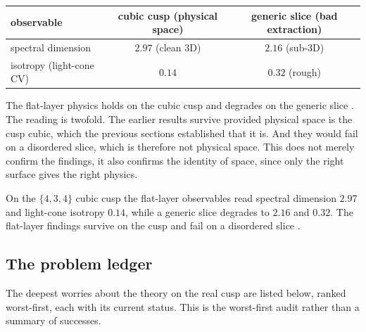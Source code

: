 \begin{table}[h]
\centering
\begin{tabular}{lcc}
\toprule
observable & cubic cusp (physical space) & generic slice (bad extraction) \\
\midrule
spectral dimension & $2.97$ (clean 3D) & $2.16$ (sub-3D) \\
isotropy (light-cone CV) & $0.14$ & $0.32$ (rough) \\
\bottomrule
\end{tabular}
\end{table}

The flat-layer physics holds on the cubic cusp and degrades on the generic slice
\cite{pollard2026vibetest}. The reading is twofold. The earlier results survive provided physical space is the
cusp cubic, which the previous sections established that it is. And they would fail on a disordered slice, which
is therefore not physical space. This does not merely confirm the findings, it also confirms the identity
of space, since only the right surface gives the right physics.

\begin{result}
On the $\{4,3,4\}$ cubic cusp the flat-layer observables read spectral dimension $2.97$ and light-cone isotropy
$0.14$, while a generic slice degrades to $2.16$ and $0.32$. The flat-layer findings survive on the cusp and fail
on a disordered slice \cite{pollard2026vibetest}.
\end{result}

\subsection{The problem ledger}

The deepest worries about the theory on the real cusp are listed below, ranked worst-first, each with its
current status. This is the worst-first audit rather than a summary of successes.

